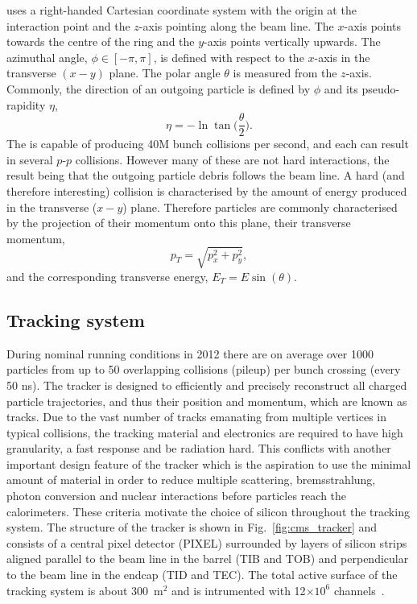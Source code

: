 \CMS uses a right-handed Cartesian coordinate system with the origin at the interaction point and the $z$-axis pointing along the beam line. The $x$-axis points towards the centre of the \LHC ring and the $y$-axis points vertically upwards. The azimuthal angle, $\phi \in [-\pi,\pi]$, is defined with respect to the $x$-axis in the transverse $(x-y)$ plane. The polar angle $\theta$ is measured from the $z$-axis. Commonly, the direction of an outgoing particle is defined by $\phi$ and its pseudo-rapidity $\eta$,
\begin{equation}
	\eta = -\ln\tan\biggl(\frac{\theta}{2}\biggr).
\end{equation}
The \LHC is capable of producing 40M bunch collisions per second, and each can result in several $p$-$p$ collisions. However many of these are not hard interactions, the result being that the outgoing particle debris follows the beam line. A hard (and therefore interesting) collision is characterised by the amount of energy produced in the transverse ($x-y$) plane. Therefore particles are commonly characterised by the projection of their momentum onto this plane, their transverse momentum,
\begin{equation}
	p_{T} = \sqrt{p_{x}^{2}+p_{y}^{2}},
\end{equation}
and the corresponding transverse energy, $E_{T} = E\sin(\theta)$.

\subsection{Tracking system}
\label{sec:tracker}

During nominal \LHC running conditions in 2012 there are on average over 1000 particles from up to 50 overlapping \pp collisions (pileup) per bunch crossing (every 50 ns). The tracker is designed to efficiently and precisely reconstruct all charged particle trajectories, and thus their position and momentum, which are known as tracks. Due to the vast number of tracks emanating from multiple vertices in typical \LHC collisions, the tracking material and electronics are required to have high granularity, a fast response and be radiation hard. This conflicts with another important design feature of the tracker which is the aspiration to use the minimal amount of material in order to reduce multiple scattering, bremsstrahlung, photon conversion and nuclear interactions before particles reach the calorimeters. These criteria motivate the choice of silicon throughout the \CMS tracking system. The structure of the \CMS tracker is shown in Fig.~\ref{fig:cms_tracker} and consists of a central pixel detector (PIXEL) surrounded by layers of silicon strips aligned parallel to the beam line in the barrel (TIB and TOB) and perpendicular to the beam line in the endcap (TID and TEC). The total active surface of the tracking system is about 300~m$^{2}$ and is intrumented with 12$\times10^{6}$ channels~\cite{tracker_project}.


